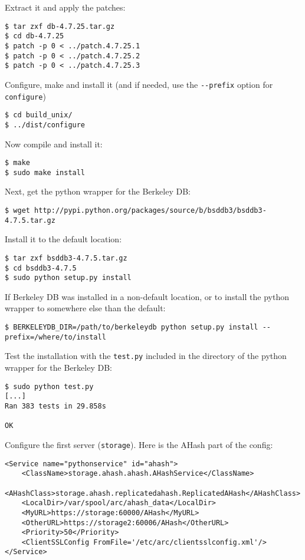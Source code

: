 \documentclass{article}
\begin{document}
Extract it and apply the patches:
\begin{verbatim}
$ tar zxf db-4.7.25.tar.gz
$ cd db-4.7.25
$ patch -p 0 < ../patch.4.7.25.1
$ patch -p 0 < ../patch.4.7.25.2
$ patch -p 0 < ../patch.4.7.25.3
\end{verbatim}

Configure, make and install it (and if needed, use the \verb!--prefix! option for \verb!configure!)
\begin{verbatim}
$ cd build_unix/
$ ../dist/configure
\end{verbatim}

Now compile and install it:
\begin{verbatim}
$ make
$ sudo make install
\end{verbatim}

Next, get the python wrapper for the Berkeley DB:

\begin{verbatim}
$ wget http://pypi.python.org/packages/source/b/bsddb3/bsddb3-4.7.5.tar.gz
\end{verbatim}

Install it to the default location:

\begin{verbatim}
$ tar zxf bsddb3-4.7.5.tar.gz
$ cd bsddb3-4.7.5
$ sudo python setup.py install
\end{verbatim}

If Berkeley DB was installed in a non-default location, or to install the python wrapper to somewhere else than the default:

\begin{verbatim}
$ BERKELEYDB_DIR=/path/to/berkeleydb python setup.py install --prefix=/where/to/install
\end{verbatim}

Test the installation with the \verb!test.py! included in the directory of the python wrapper for the Berkeley DB:
\begin{verbatim}
$ sudo python test.py
[...]
Ran 383 tests in 29.858s

OK
\end{verbatim}

Configure the first server (\verb!storage!). Here is the AHash part of the config:

\begin{verbatim}
<Service name="pythonservice" id="ahash">
    <ClassName>storage.ahash.ahash.AHashService</ClassName>
    <AHashClass>storage.ahash.replicatedahash.ReplicatedAHash</AHashClass>
    <LocalDir>/var/spool/arc/ahash_data</LocalDir>
    <MyURL>https://storage:60000/AHash</MyURL>
    <OtherURL>https://storage2:60006/AHash</OtherURL>
    <Priority>50</Priority>
    <ClientSSLConfig FromFile='/etc/arc/clientsslconfig.xml'/>
</Service>
\end{verbatim}
\end{document}
